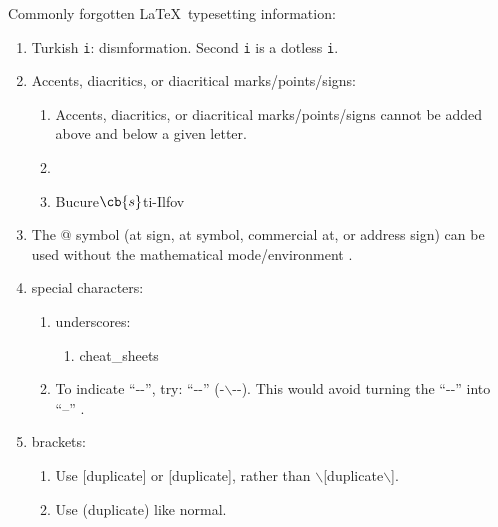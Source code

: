 Commonly forgotten \LaTeX\ typesetting information: \vspace{-0.3cm}
\begin{enumerate} \itemsep -4pt
\item Turkish {\tt i}: dis{\i}nformation. Second {\tt i} is a dotless {\tt i}.
\item Accents, diacritics, or diacritical marks/points/signs: \vspace{-0.3cm}
	\begin{enumerate} \itemsep -2pt
	\item Accents, diacritics, or diacritical marks/points/signs cannot be added above and below a given letter.
	\item \textcrd
	\item Bucure$\cb{s}$ti-Ilfov
	\end{enumerate}
\item The @ symbol (at sign, at symbol, commercial at, or address sign) can be used without the mathematical mode/environment \cite{Kopka2004}.
\item special characters: \vspace{-0.3cm}
	\begin{enumerate} \itemsep -2pt
	\item underscores: \vspace{-0.2cm}
		\begin{enumerate} \itemsep -2pt
		\item cheat\_sheets
		\end{enumerate}
	\item To indicate ``-\--'', try: ``-\--'' (-$\backslash$-\--). This would avoid turning the ``-\--'' into ``--'' \cite[\S2.5.3, pp. 26--27]{Kopka2004}.
	\end{enumerate}
\item brackets: \vspace{-0.3cm}
	\begin{enumerate} \itemsep -2pt
	\item Use $[$duplicate$]$ or [duplicate], rather than $\backslash$[duplicate$\backslash$]. %
	\item Use (duplicate) like normal.
	\end{enumerate}
\end{enumerate}






